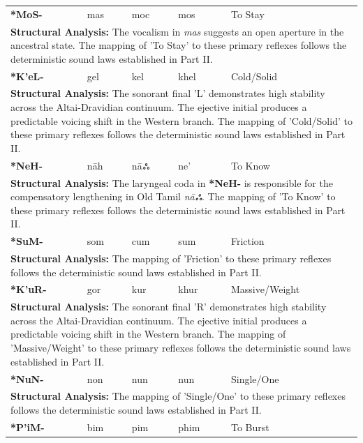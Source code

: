 \begin{longtable}{p{} p{} p{} p{} p{}}
\textbf{*MoS-} & mas & moc & mos & To Stay \\ 
\multicolumn{5}{p{\textwidth}}{\small \textbf{Structural Analysis:} The vocalism in \textit{mas} suggests an open aperture in the ancestral state. The mapping of 'To Stay' to these primary reflexes follows the deterministic sound laws established in Part II.} \\ \addlinespace[15pt] 
\textbf{*K'eL-} & gel & kel & khel & Cold/Solid \\ 
\multicolumn{5}{p{\textwidth}}{\small \textbf{Structural Analysis:} The sonorant final 'L' demonstrates high stability across the Altai-Dravidian continuum. The ejective initial produces a predictable voicing shift in the Western branch. The mapping of 'Cold/Solid' to these primary reflexes follows the deterministic sound laws established in Part II.} \\ \addlinespace[15pt] 
\textbf{*NeH-} & nāh & nāஃ & ne' & To Know \\ 
\multicolumn{5}{p{\textwidth}}{\small \textbf{Structural Analysis:} The laryngeal coda in \textbf{*NeH-} is responsible for the compensatory lengthening in Old Tamil \textit{nāஃ}. The mapping of 'To Know' to these primary reflexes follows the deterministic sound laws established in Part II.} \\ \addlinespace[15pt] 
\textbf{*SuM-} & som & cum & sum & Friction \\ 
\multicolumn{5}{p{\textwidth}}{\small \textbf{Structural Analysis:}  The mapping of 'Friction' to these primary reflexes follows the deterministic sound laws established in Part II.} \\ \addlinespace[15pt] 
\textbf{*K'uR-} & gor & kur & khur & Massive/Weight \\ 
\multicolumn{5}{p{\textwidth}}{\small \textbf{Structural Analysis:} The sonorant final 'R' demonstrates high stability across the Altai-Dravidian continuum. The ejective initial produces a predictable voicing shift in the Western branch. The mapping of 'Massive/Weight' to these primary reflexes follows the deterministic sound laws established in Part II.} \\ \addlinespace[15pt] 
\textbf{*NuN-} & non & nun & nun & Single/One \\ 
\multicolumn{5}{p{\textwidth}}{\small \textbf{Structural Analysis:}  The mapping of 'Single/One' to these primary reflexes follows the deterministic sound laws established in Part II.} \\ \addlinespace[15pt] 
\textbf{*P'iM-} & bim & pim & phim & To Burst \\ 

\end{longtable}
